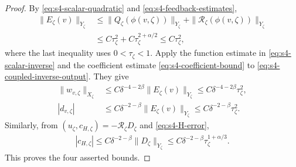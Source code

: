 \documentclass[a4paper,11pt,oneside,reqno]{amsart}
\numberwithin{equation}{section}
\theoremstyle{definition}
\begin{document}
\begin{proof}
    By \eqref{eq:s4-scalar-quadratic} and
    \eqref{eq:s4-feedback-estimates},
    \begin{align*}
        \|E_\zeta(v)\|_{Y_\zeta}
        &\leq \|Q_\zeta(\phi(v,\zeta))\|_{Y_\zeta}
        +\|\mathcal R_\zeta(\phi(v,\zeta))\|_{Y_\zeta}\\
        &\leq C\tau_\zeta^2+C\tau_\zeta^{2+\alpha/2}
        \leq C\tau_\zeta^2,
    \end{align*}
    where the last inequality uses $0<\tau_\zeta<1$.
    Apply the function estimate in \eqref{eq:s4-scalar-inverse}
    and the coefficient estimate \eqref{eq:s4-coefficient-bound}
    to \eqref{eq:s4-coupled-inverse-output}. They give
    \begin{align*}
        \|w_{v,\zeta}\|_{X_\zeta}
        &\leq C\delta^{-4-2\beta}\|E_\zeta(v)\|_{Y_\zeta}
        \leq C\delta^{-4-2\beta}\tau_\zeta^2,\\
        |d_{v,\zeta}|
        &\leq C\delta^{-2-\beta}\|E_\zeta(v)\|_{Y_\zeta}
        \leq C\delta^{-2-\beta}\tau_\zeta^2.
    \end{align*}
    Similarly, from
    $(u_\zeta,c_{H,\zeta})=-\mathscr R_\zeta D_\zeta$ and
    \eqref{eq:s4-H-error},
    \begin{align*}
        |c_{H,\zeta}|
        \leq C\delta^{-2-\beta}\|D_\zeta\|_{Y_\zeta}
        \leq C\delta^{-2-\beta}\tau_\zeta^{1+\alpha/3}.
    \end{align*}
    This proves the four asserted bounds.


\end{proof}
\end{document}
